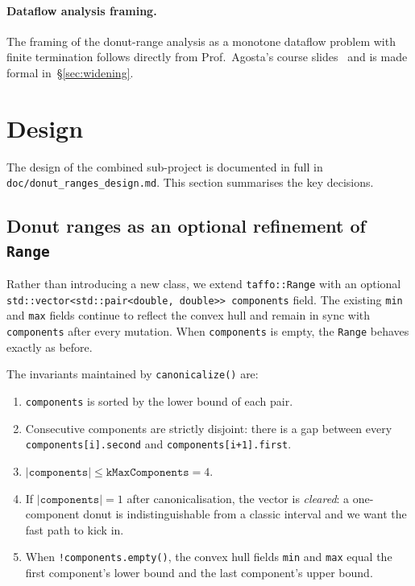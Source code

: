 \documentclass[11pt,a4paper]{article}
\theoremstyle{plain}
\begin{document}
\paragraph{Dataflow analysis framing.}
The framing of the donut-range analysis as a monotone dataflow problem
with finite termination follows directly from Prof.~Agosta's course
slides~\cite[slides 13--14]{cot-dataflow} and is made formal
in~\S\ref{sec:widening}.

\section{Design}
\label{sec:design}

The design of the combined sub-project is documented in full in
\texttt{doc/donut\_ranges\_design.md}. This section summarises the key
decisions.

\subsection{Donut ranges as an optional refinement of \texttt{Range}}

Rather than introducing a new class, we extend \texttt{taffo::Range}
with an optional
\texttt{std::vector<std::pair<double, double>> components} field. The
existing \texttt{min} and \texttt{max} fields continue to reflect the
convex hull and remain in sync with \texttt{components} after every
mutation. When \texttt{components} is empty, the \texttt{Range}
behaves exactly as before.

The invariants maintained by \texttt{canonicalize()} are:
\begin{enumerate}
\item \texttt{components} is sorted by the lower bound of each pair.
\item Consecutive components are strictly disjoint: there is a gap
      between every \texttt{components[i].second} and
      \texttt{components[i+1].first}.
\item $|\texttt{components}| \le \texttt{kMaxComponents} = 4$.
\item If $|\texttt{components}| = 1$ after canonicalisation, the vector
      is \emph{cleared}: a one-component donut is indistinguishable
      from a classic interval and we want the fast path to kick in.
\item When \texttt{!components.empty()}, the convex hull fields
      \texttt{min} and \texttt{max} equal the first component's lower
      bound and the last component's upper bound.
\end{enumerate}
\end{document}
